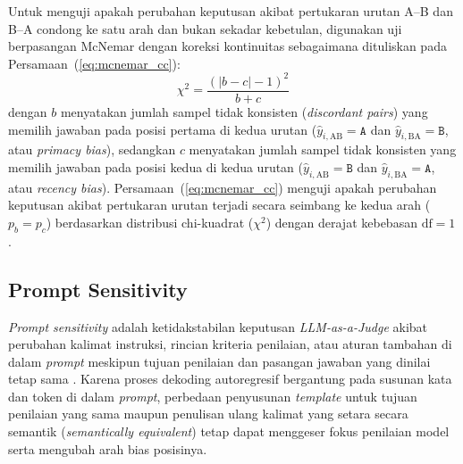 Untuk menguji apakah perubahan keputusan akibat pertukaran urutan A--B dan B--A condong ke satu arah dan bukan sekadar kebetulan, digunakan uji berpasangan McNemar dengan koreksi kontinuitas \cite{mcnemarNoteSamplingError1947}\cite{raoAgreementMetricsLLMasJudge2026}\cite{yinDoesJudgePrefer2026} sebagaimana dituliskan pada Persamaan~(\ref{eq:mcnemar_cc}):
\begin{equation}
  \chi^2 = \frac{\left(|b - c| - 1\right)^2}{b + c}
  \label{eq:mcnemar_cc}
\end{equation}
dengan $b$ menyatakan jumlah sampel tidak konsisten (\textit{discordant pairs}) yang memilih jawaban pada posisi pertama di kedua urutan ($\hat{y}_{i,\text{AB}} = \texttt{A}$ dan $\hat{y}_{i,\text{BA}} = \texttt{B}$, atau \textit{primacy bias}), sedangkan $c$ menyatakan jumlah sampel tidak konsisten yang memilih jawaban pada posisi kedua di kedua urutan ($\hat{y}_{i,\text{AB}} = \texttt{B}$ dan $\hat{y}_{i,\text{BA}} = \texttt{A}$, atau \textit{recency bias}). Persamaan~(\ref{eq:mcnemar_cc}) menguji apakah perubahan keputusan akibat pertukaran urutan terjadi secara seimbang ke kedua arah ($p_b = p_c$) berdasarkan distribusi chi-kuadrat ($\chi^2$) dengan derajat kebebasan $\text{df} = 1$ \cite{mcnemarNoteSamplingError1947}.

\subsection{Prompt Sensitivity}

\textit{Prompt sensitivity} adalah ketidakstabilan keputusan \textit{LLM-as-a-Judge} akibat perubahan kalimat instruksi, rincian kriteria penilaian, atau aturan tambahan di dalam \textit{prompt} meskipun tujuan penilaian dan pasangan jawaban yang dinilai tetap sama \cite{guSurveyLLMasaJudge2025}\cite{weiSystematicEvaluationLLMasaJudge2025}\cite{bellibatluJudgeSenseBenchmarkPrompt2026}. Karena proses dekoding autoregresif bergantung pada susunan kata dan token di dalam \textit{prompt}, perbedaan penyusunan \textit{template} untuk tujuan penilaian yang sama \cite{weiSystematicEvaluationLLMasaJudge2025} maupun penulisan ulang kalimat yang setara secara semantik (\textit{semantically equivalent}) \cite{bellibatluJudgeSenseBenchmarkPrompt2026} tetap dapat menggeser fokus penilaian model serta mengubah arah bias posisinya.

